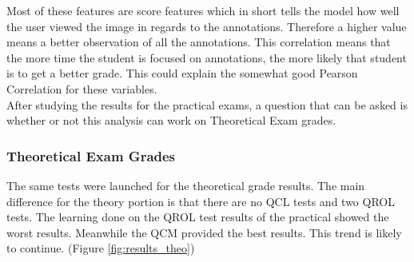 \documentclass[a4paper,11pt]{report}
\numberwithin{figure}{section} %
\begin{document}
   Most of these features are score features which in short tells the model how well the user viewed the image in regards to the annotations. Therefore a higher value means a better observation of all the annotations. This correlation means that the more time the student is focused on annotations, the more likely that student is to get a better grade. This could explain the somewhat good Pearson Correlation for these variables.\\
   
   After studying the results for the practical exams, a question that can be asked is whether or not this analysis can work on Theoretical Exam grades.
    
    \subsubsection{Theoretical Exam Grades}
        
        The same tests were launched for the theoretical grade results. The main difference for the theory portion is that there are no QCL tests and two QROL tests. The learning done on the QROL test results of the practical showed the worst results. Meanwhile the QCM provided the best results. This trend is likely to continue. (Figure \ref{fig:results_theo})
        
\end{document}
